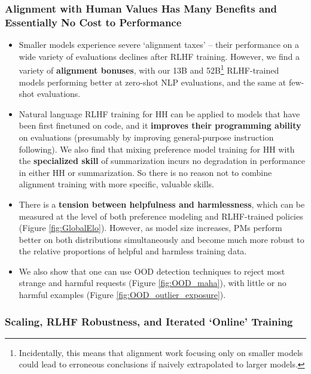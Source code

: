 \subsubsection*{Alignment with Human Values Has Many Benefits and Essentially No Cost to Performance}

\begin{itemize}
    \item  Smaller models experience severe `alignment taxes' -- their performance on a wide variety of evaluations declines after RLHF training.  However, we find a variety of {\bf alignment bonuses}, with our 13B and 52B\footnote{Incidentally, this means that alignment work focusing only on smaller models could lead to erroneous conclusions if naively extrapolated to larger models.} RLHF-trained models performing better at zero-shot NLP evaluations, and the same at few-shot evaluations.  
    \item Natural language RLHF training for HH can be applied to models that have been first finetuned on code, and it {\bf  improves their programming ability} on evaluations (presumably by improving general-purpose instruction following).  We also find that mixing preference model training for HH with the {\bf specialized skill} of summarization \cite{stiennon2020learning} incurs no degradation in performance in either HH or summarization.  So there is no reason not to combine alignment training with more specific, valuable skills.
    \item There  is a {\bf tension between helpfulness and harmlessness}, which can be measured at the level of both preference modeling and RLHF-trained policies (Figure \ref{fig:GlobalElo}).   However, as model size increases, PMs perform better on both distributions simultaneously and become much more robust to the relative proportions of helpful and harmless training data.  
    \item We also show that one can use OOD detection techniques \cite{fort2021exploring} to reject most strange and harmful requests (Figure \ref{fig:OOD_maha}), with little or no harmful examples (Figure \ref{fig:OOD_outlier_exposure}).
\end{itemize}

\subsubsection*{Scaling,  RLHF Robustness, and Iterated `Online' Training}

